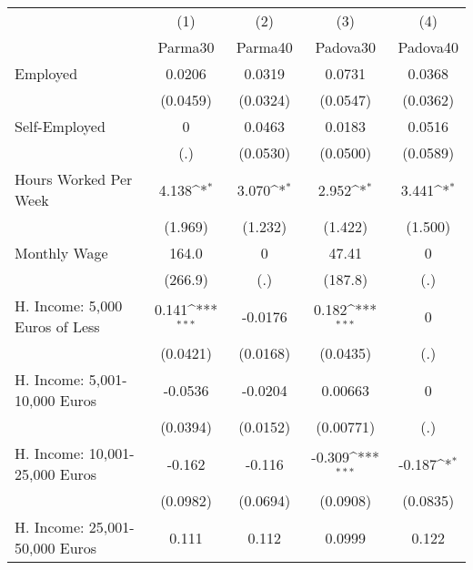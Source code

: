 {
\def\sym#1{\ifmmode^{#1}\else\(^{#1}\)\fi}
\begin{tabular}{l*{4}{c}}
\hline\hline
            &\multicolumn{1}{c}{(1)}&\multicolumn{1}{c}{(2)}&\multicolumn{1}{c}{(3)}&\multicolumn{1}{c}{(4)}\\
            &\multicolumn{1}{c}{Parma30}&\multicolumn{1}{c}{Parma40}&\multicolumn{1}{c}{Padova30}&\multicolumn{1}{c}{Padova40}\\
\hline
Employed    &      0.0206         &      0.0319         &      0.0731         &      0.0368         \\
            &    (0.0459)         &    (0.0324)         &    (0.0547)         &    (0.0362)         \\
[1em]
Self-Employed&           0         &      0.0463         &      0.0183         &      0.0516         \\
            &         (.)         &    (0.0530)         &    (0.0500)         &    (0.0589)         \\
[1em]
Hours Worked Per Week&       4.138\sym{*}  &       3.070\sym{*}  &       2.952\sym{*}  &       3.441\sym{*}  \\
            &     (1.969)         &     (1.232)         &     (1.422)         &     (1.500)         \\
[1em]
Monthly Wage&       164.0         &           0         &       47.41         &           0         \\
            &     (266.9)         &         (.)         &     (187.8)         &         (.)         \\
[1em]
H. Income: 5,000 Euros of Less&       0.141\sym{***}&     -0.0176         &       0.182\sym{***}&           0         \\
            &    (0.0421)         &    (0.0168)         &    (0.0435)         &         (.)         \\
[1em]
H. Income: 5,001-10,000 Euros&     -0.0536         &     -0.0204         &     0.00663         &           0         \\
            &    (0.0394)         &    (0.0152)         &   (0.00771)         &         (.)         \\
[1em]
H. Income: 10,001-25,000 Euros&      -0.162         &      -0.116         &      -0.309\sym{***}&      -0.187\sym{*}  \\
            &    (0.0982)         &    (0.0694)         &    (0.0908)         &    (0.0835)         \\
[1em]
H. Income: 25,001-50,000 Euros&       0.111         &       0.112         &      0.0999         &       0.122         \\

\end{tabular}}
